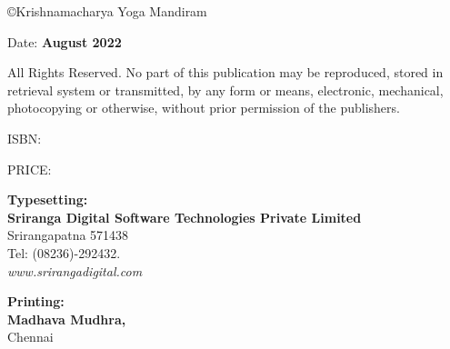\thispagestyle{empty}

{\small\copyright{Krishnamacharya Yoga Mandiram}}
\bigskip

Date: \textbf{August 2022}
\vfill

{\small
All Rights Reserved. No part of this publication may be reproduced, stored in retrieval system or 
transmitted, by any form or means, electronic, mechanical, photocopying or otherwise, without 
prior permission of the publishers.}
\vspace{1cm}

ISBN: 
\bigskip

PRICE:
\vfill

\textbf{Typesetting:}\\[4pt] 
\textbf{Sriranga Digital Software Technologies Private Limited}\\ 
Srirangapatna 571438\\ 
Tel: (08236)-292432.\\ 
\textit{www.srirangadigital.com}
\vfill

\textbf{Printing:}\\ [4pt] 
\textbf{Madhava Mudhra,}\\ 
Chennai

